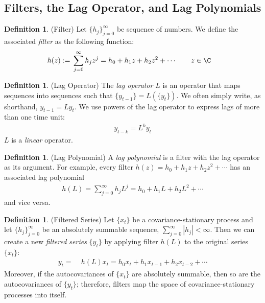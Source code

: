 \documentclass[12pt]{article}
\theoremstyle{plain}
\theoremstyle{definition}
\newtheorem{defn}[thm]{Definition}
\theoremstyle{remark}
\begin{document}
\clearpage
\subsection{Filters, the Lag Operator, and Lag Polynomials}

\begin{defn}(Filter)
Let $\{h_j\}_{j=0}^\infty$ be sequence of numbers.
We define the associated \emph{filter} as the following function:
\begin{align*}
  h(z) :=&\; \sum_{j=0}^\infty h_j z^j
  = h_0 + h_1 z + h_2 z^2 + \cdots
  \qquad z\in\C
\end{align*}
\end{defn}

\begin{defn}(Lag Operator)
The \emph{lag operator} $L$ is an operator that maps sequences
into sequences such that $\{y_{t-1}\}=L\left(\{y_t\}\right)$. We often
simply write, as shorthand, $y_{t-1}=Ly_t$. We use powers of the lag
operator to express lags of more than one time unit:
\begin{align*}
  y_{t-k} = L^k y_t
\end{align*}
$L$ is a \emph{linear} operator.
\end{defn}

\begin{defn}(Lag Polynomial)
A \emph{lag polynomial} is a filter with the lag operator as its
argument. For example, every filter $h(z)=h_0+h_1z + h_2z^2+\cdots$ has
an associated lag polynomial
\begin{align*}
  h(L) = \sum_{j=0}^\infty h_j L^j = h_0 + h_1L + h_2 L^2 + \cdots
\end{align*}
and vice versa.
\end{defn}

\begin{defn}(Filtered Series)
Let $\{x_t\}$ be a covariance-stationary process and let
$\{h_j\}_{j=0}^\infty$ be an absolutely summable sequence,
$\sum_{j=0}^\infty |h_j|<\infty$.
Then we can create a new \emph{filtered series} $\{y_t\}$ by applying
filter $h(L)$ to the original series $\{x_t\}$:
\begin{align*}
  y_t =&\; h(L)x_t
  = h_0 x_t + h_1x_{t-1} + h_2x_{t-2} + \cdots
\end{align*}
Moreover, if the autocovariances of $\{x_t\}$ are absolutely summable,
then so are the autocovariances of $\{y_t\}$; therefore, filters map the
space of covariance-stationary processes into itself.
\end{defn}
\end{document}

